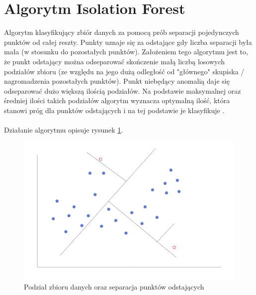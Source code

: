 \documentclass[eng,printmode]{mgr}
\begin{document}
\section{Algorytm Isolation Forest}
\label{sec:if}
Algorytm klasyfikujący zbiór danych za pomocą prób separacji pojedynczych punktów od całej reszty. Punkty uznaje się za odstające gdy liczba separacji była mała (w stosunku do pozostałych punktów). Założeniem tego algorytmu jest to, że punkt odstający można odseparować skończenie małą liczbą losowych podziałów zbioru (ze względu na jego dużą odległość od "głównego" skupiska / nagromadzenia pozostałych punktów). Punkt niebędący anomalią daje się odseparować dużo większą ilością podziałów. Na podstawie maksymalnej oraz średniej ilości takich podziałów algorytm wyznacza optymalną ilość, która stanowi próg dla punktów odstających i na tej podstawie je klasyfikuje \cite{isolation-forest} \cite{isolation-forest-1}.
\\\\
Działanie algorytmu opisuje rysunek \ref{fig:isolation_forest}.

\begin{figure}[H]
  \begin{center}
  \includegraphics[scale=0.7]{isolation_forest}
  \end{center}
  \caption{Podział zbioru danych oraz separacja punktów odstających}
  \label{fig:isolation_forest}
\end{figure}
\end{document}
